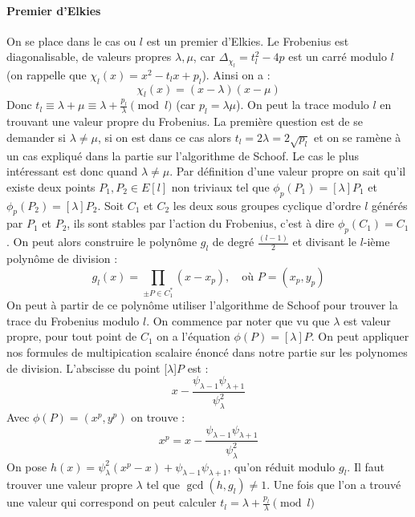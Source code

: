 \documentclass[12pt]{article}
\begin{document}
\paragraph*{Premier d'Elkies}
On se place dans le cas ou $l$ est un premier d'Elkies. Le Frobenius est diagonalisable, de valeurs propres $\lambda, \mu$, car $\Delta_{\chi_l} =t_l^2 -4p$ est un carré modulo $l$ (on rappelle que $\chi_{l}(x) = x^2 - t_lx +p_l$). Ainsi on a :
\begin{equation*}
\chi_l(x) = (x - \lambda)(x- \mu)
\end{equation*}
Donc $t_l \equiv \lambda +\mu \equiv \lambda + \frac{p_l}{\lambda} \pmod l$ (car $p_l = \lambda\mu$). On peut la trace modulo $l$ en trouvant une valeur propre du Frobenius. La première question est de se demander si $\lambda \ne \mu$, si on est dans ce cas alors $t_l = 2 \lambda = 2 \sqrt{p_l}$ et on se ramène à un cas expliqué dans la partie sur l'algorithme de Schoof. Le cas le plus intéressant est donc quand $\lambda \ne \mu$. Par définition d'une valeur propre on sait qu'il existe deux points $P_1,P_2 \in E[l]$ non triviaux tel que $\phi_p(P_1) = [\lambda]P_1$ et $\phi_p(P_2) = [\lambda]P_2$. Soit $C_1$ et $C_2$ les deux sous groupes cyclique d'ordre $l$ générés par $P_1$ et $P_2$, ils sont stables par l'action du Frobenius, c'est à dire $\phi_p(C_1) = C_1$. On peut alors construire le polynôme $g_l$ de degré $\frac{(l-1)}{2}$ et divisant le $l$-ième polynôme de division : 
\begin{equation}
\label{poly g_l}
g_l(x) = \prod_{\pm P \in C_1^*} (x - x_p), \quad \text{où } P = (x_p, y_p)
\end{equation}
On peut à partir de ce polynôme utiliser l'algorithme de Schoof pour trouver la trace du Frobenius modulo $l$. On commence par noter que vu que $\lambda$ est valeur propre, pour tout point de $C_1$  on a l'équation $\phi(P) = [\lambda]P$. On peut appliquer nos formules de multipication scalaire énoncé dans notre partie sur les polynomes de division. L'abscisse du point [$\lambda$]$P$ est : 
\begin{equation*}
x - \frac{\psi_{\lambda-1}\psi_{\lambda+1}}{\psi_{\lambda}^2}
\end{equation*}
Avec $\phi(P)=(x^p,y^p)$ on trouve :
\begin{equation*}
x^p = x - \frac{\psi_{\lambda-1}\psi_{\lambda+1}}{\psi_{\lambda}^2}
\end{equation*}
On pose $h(x) = \psi_{\lambda}^2(x^p-x) + \psi_{\lambda-1}\psi_{\lambda+1}$, qu'on réduit modulo $g_l$. Il faut trouver une valeur propre $\lambda$ tel que $\gcd(h,g_l) \ne 1$. Une fois que l'on a trouvé une valeur qui correspond on peut calculer $t_l = \lambda + \frac{p_l}{\lambda} \pmod l$
\end{document}

